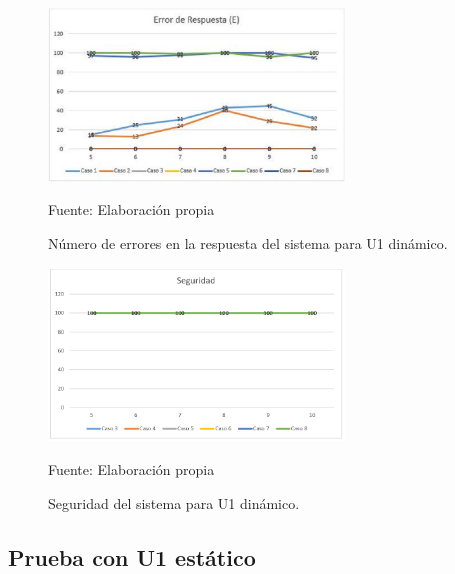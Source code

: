 \begin{figure}[H]
\begin{center}
\includegraphics[width=0.7\textwidth]{Imagenes/Cap4/image007}
\end{center}
\begin{center}
\vskip -0.5cm
\caption{\small{Número de errores en la respuesta del sistema para U1 dinámico.}}
\label{fig:figura4.7}
{\small{Fuente: Elaboración propia}}
\end{center}
\end{figure}

\begin{figure}[H]
\begin{center}
\includegraphics[width=0.7\textwidth]{Imagenes/Cap4/image008}
\end{center}
\begin{center}
\vskip -0.5cm
\caption{\small{Seguridad del sistema para U1 dinámico.}}
\label{fig:figura4.8}
{\small{Fuente: Elaboración propia}}
\end{center}
\end{figure}

\subsection{Prueba con U1 estático}

